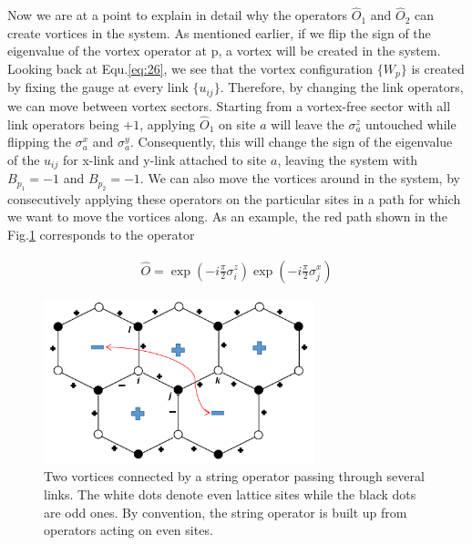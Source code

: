 \documentclass{article}
\begin{document}
Now we are at a point to explain in detail why the operators $\hat{O}_1$ and $\hat{O}_2$ can create vortices in the system. As mentioned earlier, if we flip the sign of the eigenvalue of the vortex operator at p, a vortex will be created in the system. Looking back at Equ.\hspace{0.2mm}\ref{eq:26}, we see that the vortex configuration $\{W_p\}$ is created by fixing the gauge at every link $\{u_{ij}\}$. Therefore, by changing the link operators, we can move between vortex sectors. Starting from a vortex-free sector with all link operators being $+1$, applying $\hat{O}_1$ on site $a$ will leave the $\sigma^z_a$ untouched while flipping the $\sigma^x_a$ and $\sigma^y_a$. Consequently, this will change the sign of the eigenvalue of the $u_{ij}$ for x-link and y-link attached to site $a$, leaving the system with $B_{p_1} = -1$ and $B_{p_2} = -1$. We can also move the vortices around in the system, by consecutively applying these operators on the particular sites in a path for which we want to move the vortices along. As an example, the red path shown in the Fig.\hspace{0.2mm}\ref{fig:string} corresponds to the operator

\begin{equation}\label{eq:29}
	\begin{aligned}
		\hat{O} = \exp{(-i\frac{\pi}{2}\sigma^z_i)} \exp{(-i\frac{\pi}{2}\sigma^x_j)}
		\end{aligned}
\end{equation}

\begin{figure}[!htb]
    \centering
    \includegraphics[width=0.7\textwidth]{./images/Anyons_Strings}
    \caption{Two vortices connected by a string operator passing through several links. The white dots denote even lattice sites while the black dots are odd ones. By convention, the string operator is built up from operators acting on even sites.}
    \label{fig:string}
\end{figure}{}
\end{document}

